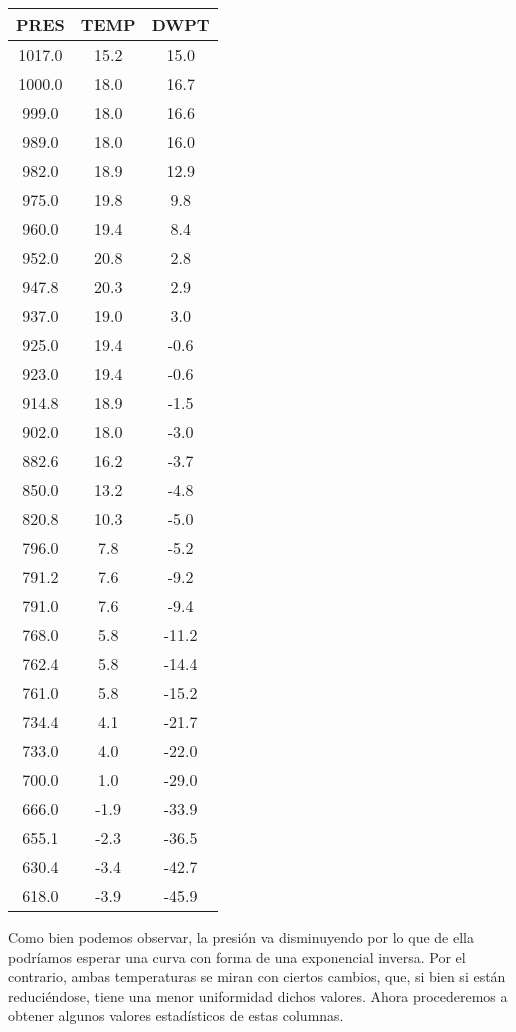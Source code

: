 \documentclass[a4paper,12pt]{article}
\begin{document}
\begin{center}
\begin{tabular}{|c|c|c|}
\hline
PRES &	TEMP&	DWPT \\ \hline
1017.0&	15.2&	15.0\\ \hline
1000.0&	18.0&	16.7\\ \hline
999.0	&18.0&	16.6\\ \hline
989.0&	18.0&	16.0\\ \hline
982.0&	18.9&	12.9\\ \hline
975.0&	19.8&	9.8\\ \hline
960.0&	19.4&	8.4\\ \hline
952.0&	20.8&	2.8\\ \hline
947.8&	20.3&	2.9\\ \hline
937.0&	19.0&	3.0\\ \hline
925.0&	19.4&	-0.6\\ \hline
923.0&	19.4&	-0.6\\ \hline
914.8&	18.9&	-1.5\\ \hline
902.0&	18.0&	-3.0\\ \hline
882.6&	16.2&	-3.7\\ \hline
850.0&	13.2&	-4.8\\ \hline
820.8&	10.3&	-5.0\\ \hline
796.0&	7.8	 &   -5.2\\ \hline
791.2&	7.6	  &  -9.2\\ \hline
791.0&	7.6	&    -9.4\\ \hline
768.0&	5.8	 &   -11.2\\ \hline
762.4&	5.8	 &   -14.4\\ \hline
761.0&	5.8	 &   -15.2\\ \hline
734.4&	4.1	 &   -21.7\\ \hline
733.0&	4.0	 &   -22.0\\ \hline
700.0&	1.0	 &   -29.0\\ \hline
666.0&	-1.9&	-33.9\\ \hline
655.1&	-2.3&	-36.5\\ \hline
630.4&	-3.4&	-42.7\\ \hline
618.0&	-3.9&	-45.9\\ \hline
\end{tabular}
\end{center}

\noindent
Como bien podemos observar, la presión va disminuyendo por lo que de ella podríamos esperar una curva con forma de una exponencial inversa. Por el contrario, ambas temperaturas se miran con ciertos cambios, que, si bien si están reduciéndose, tiene una menor uniformidad dichos valores. Ahora procederemos a obtener algunos valores estadísticos de estas columnas.
\end{document}
